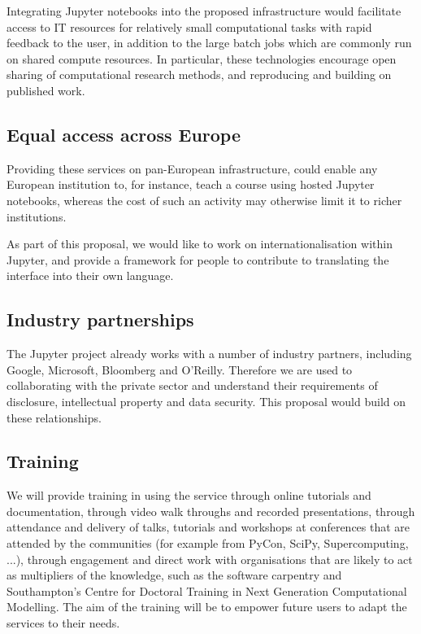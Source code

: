Integrating Jupyter notebooks into the proposed infrastructure would facilitate
access to IT resources for relatively small computational tasks with rapid
feedback to the user, in addition to the large batch jobs which are commonly
run on shared compute resources. In particular, these technologies encourage
open sharing of computational research methods, and reproducing and building on
published work.


\subsection{Equal access across Europe}

Providing these services on pan-European infrastructure, could enable any
European institution to, for instance, teach a course using hosted Jupyter
notebooks, whereas the cost of such an activity may otherwise limit it to richer
institutions.

As part of this proposal, we would like to work on internationalisation within
Jupyter, and provide a framework for people to contribute to translating the
interface into their own language.


\subsection{Industry partnerships}

The Jupyter project already works with a number of industry partners, including
Google, Microsoft, Bloomberg and O'Reilly. Therefore we are used to collaborating with the private sector and understand their requirements of disclosure, intellectual property and data security. This proposal would build on these relationships.


\subsection{Training}

We will provide training in using the service through online tutorials
and documentation, through video walk throughs and recorded
presentations, through attendance and delivery of talks, tutorials and
workshops at conferences that are attended by the communities (for
example from PyCon, SciPy, Supercomputing, ...), through engagement
and direct work with organisations that are likely to act as
multipliers of the knowledge, such as the software carpentry and
Southampton's Centre for Doctoral Training in Next Generation
Computational Modelling. The aim of the training will be to empower
future users to adapt the services to their needs.


